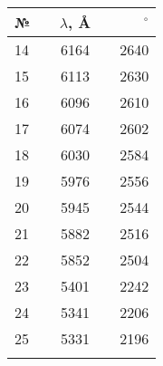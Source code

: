 \begin{tabular}{lcccr}
\toprule
№ & {\hspace{0.5cm}} & $\lambda$, Å & {\hspace{0.5cm}} & $^\circ$ \\
\midrule
14 & {} & 6164 & {} & 2640 \\
15 & {} & 6113 & {} & 2630 \\
16 & {} & 6096 & {} & 2610 \\
17 & {} & 6074 & {} & 2602 \\
18 & {} & 6030 & {} & 2584 \\
19 & {} & 5976 & {} & 2556 \\
20 & {} & 5945 & {} & 2544 \\
21 & {} & 5882 & {} & 2516 \\
22 & {} & 5852 & {} & 2504 \\
23 & {} & 5401 & {} & 2242 \\
24 & {} & 5341 & {} & 2206 \\
25 & {} & 5331 & {} & 2196 \\
{} & {} &   {} & {} &    {} \\
\bottomrule
\end{tabular}
